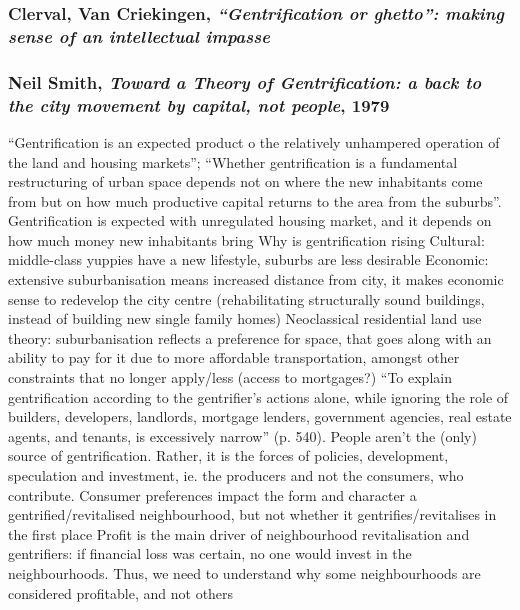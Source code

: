 \documentclass{article}
\begin{document}
\subsubsection{Clerval, Van Criekingen, \textit{``Gentrification or ghetto'': making sense of an intellectual impasse}}

\begin{outline}
	\1
\end{outline}

\subsubsection{Neil Smith, \textit{Toward a Theory of Gentrification: a back to the city movement by capital, not people}, 1979}

\begin{outline}
	\1 ``Gentrification is an expected product o the relatively unhampered operation of the land and housing markets''; ``Whether gentrification is a fundamental restructuring of urban space depends not on where the new inhabitants come from but on how much productive capital returns to the area from the suburbs''. Gentrification is expected with unregulated housing market, and it depends on how much money new inhabitants bring
	\1 Why is gentrification rising
		\2 Cultural: middle-class yuppies have a new lifestyle, suburbs are less desirable
		\2 Economic: extensive suburbanisation means increased distance from city, it makes economic sense to redevelop the city centre (rehabilitating structurally sound buildings, instead of building new single family homes)
	\1 Neoclassical residential land use theory: suburbanisation reflects a preference for space, that goes along with an ability to pay for it due to more affordable transportation, amongst other constraints that no longer apply/less (access to mortgages?)
	\1 ``To explain gentrification according to the gentrifier's actions alone, while ignoring the role of builders, developers, landlords, mortgage lenders, government agencies, real estate agents, and tenants, is excessively narrow'' (p. 540). People aren't the (only) source of gentrification. Rather, it is the forces of policies, development, speculation and investment, ie. the producers and not the consumers, who contribute. Consumer preferences impact the form and character a gentrified/revitalised neighbourhood, but not whether it gentrifies/revitalises in the first place
	\1 Profit is the main driver of neighbourhood revitalisation and gentrifiers: if financial loss was certain, no one would invest in the neighbourhoods. Thus, we need to understand why some neighbourhoods are considered profitable, and not others

\end{outline}
\end{document}
